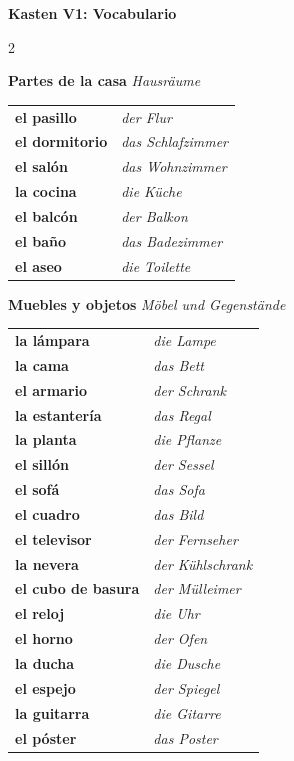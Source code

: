 \documentclass[10pt, a4paper]{article}
\newcommand{\sanstext}[1]{{\fontfamily{phv}\selectfont #1}}
\newcommand{\es}[1]{\textbf{#1}}
\newcommand{\de}[1]{{\small\textit{\textcolor{mittelgrau}{#1}}}}
\begin{document}
\begin{vokabelbox}
\sanstext{\footnotesize\textbf{Kasten V1: Vocabulario}}

\vspace{4pt}

\begin{multicols}{2}

{\small\textbf{Partes de la casa} \de{Hausräume}}

\vspace{2pt}

{\footnotesize
\begin{tabular}{@{}ll@{}}
\es{el pasillo} & \de{der Flur} \\
\es{el dormitorio} & \de{das Schlafzimmer} \\
\es{el salón} & \de{das Wohnzimmer} \\
\es{la cocina} & \de{die Küche} \\
\es{el balcón} & \de{der Balkon} \\
\es{el baño} & \de{das Badezimmer} \\
\es{el aseo} & \de{die Toilette} \\
\end{tabular}}

\columnbreak

{\small\textbf{Muebles y objetos} \de{Möbel und Gegenstände}}

\vspace{2pt}

{\footnotesize
\begin{tabular}{@{}ll@{}}
\es{la lámpara} & \de{die Lampe} \\
\es{la cama} & \de{das Bett} \\
\es{el armario} & \de{der Schrank} \\
\es{la estantería} & \de{das Regal} \\
\es{la planta} & \de{die Pflanze} \\
\es{el sillón} & \de{der Sessel} \\
\es{el sofá} & \de{das Sofa} \\
\es{el cuadro} & \de{das Bild} \\
\es{el televisor} & \de{der Fernseher} \\
\es{la nevera} & \de{der Kühlschrank} \\
\es{el cubo de basura} & \de{der Mülleimer} \\
\es{el reloj} & \de{die Uhr} \\
\es{el horno} & \de{der Ofen} \\
\es{la ducha} & \de{die Dusche} \\
\es{el espejo} & \de{der Spiegel} \\
\es{la guitarra} & \de{die Gitarre} \\
\es{el póster} & \de{das Poster} \\
\end{tabular}}

\end{multicols}
\end{vokabelbox}
\end{document}
